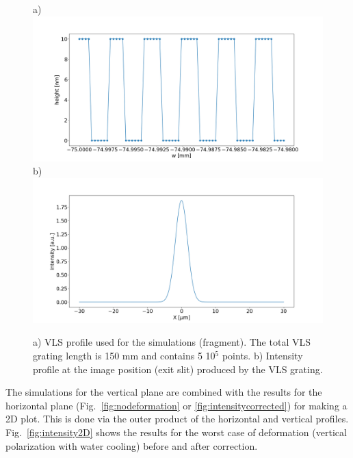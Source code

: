 \documentclass{iucr}              %
\begin{document}
  \begin{figure}
  \label{fig:grating} 
  \begin{center}

  a)\\
  \includegraphics[width=1\textwidth]{figures/grating.png} 
  b) \\
   \includegraphics[width=1\textwidth]{figures/intensitygrating.png}


  \end{center}
  \caption
  { 
a) VLS profile used for the simulations (fragment). The total VLS grating length is 150 mm and contains 5 10$^5$ points. b) Intensity profile at the image position (exit slit) produced by the VLS grating.   
}
  \end{figure}


The simulations for the vertical plane are combined with the results for the horizontal plane (Fig.~\ref{fig:nodeformation} or \ref{fig:intensitycorrected}) for making a 2D plot. This is done via the outer product of the horizontal and vertical profiles. Fig.~\ref{fig:intensity2D} shows the results for the worst case of deformation (vertical polarization with water cooling) before and after correction. 
\end{document}

